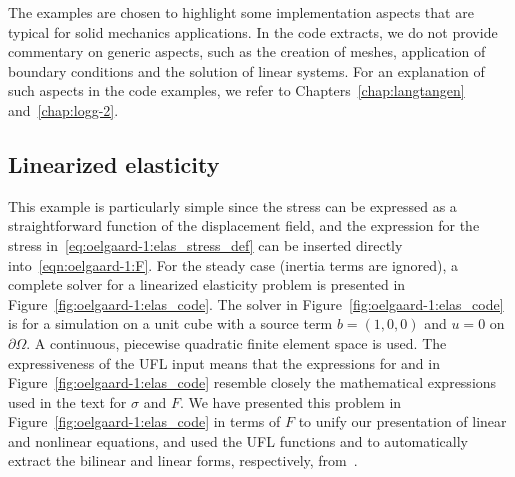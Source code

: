 The examples are chosen to highlight some implementation aspects that
are typical for solid mechanics applications. In the code extracts, we
do not provide commentary on generic aspects, such as the creation of
meshes, application of boundary conditions and the solution of linear
systems. For an explanation of such aspects in the code examples, we
refer to Chapters~\ref{chap:langtangen} and~\ref{chap:logg-2}.

\subsection{Linearized elasticity}

This example is particularly simple since the stress can be expressed as
a straightforward function of the displacement field, and the expression
for the stress in~\eqref{eq:oelgaard-1:elas_stress_def} can be inserted
directly into~\eqref{eqn:oelgaard-1:F}.  For the steady case (inertia
terms are ignored), a complete solver for a linearized elasticity
problem is presented in Figure~\ref{fig:oelgaard-1:elas_code}.
The solver in Figure~\ref{fig:oelgaard-1:elas_code} is for a
simulation on a unit cube with a source term $b = (1, 0, 0)$ and
$u = 0$ on $\partial \Omega$.  A continuous, piecewise quadratic
finite element space is used.  The expressiveness of the UFL input
means that the expressions for  and  in
Figure~\ref{fig:oelgaard-1:elas_code} resemble closely the mathematical
expressions used in the text for $\sigma$ and $F$. We have presented
this problem in Figure~\ref{fig:oelgaard-1:elas_code} in terms of $F$
to unify our presentation of linear and nonlinear equations, and used
the UFL functions  and  to automatically extract the
bilinear and linear forms, respectively, from~.

